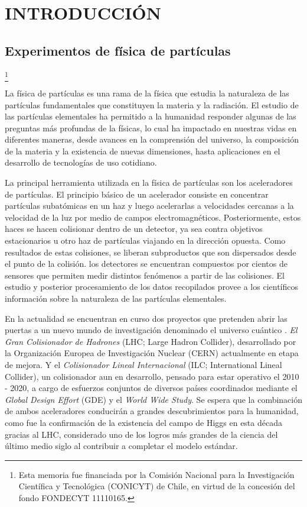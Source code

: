 \newcommand\blfootnote[1]{%
  \begingroup
  \renewcommand\thefootnote{}\footnote{#1}%
  \addtocounter{footnote}{-1}%
  \endgroup
}

\chapter{INTRODUCCIÓN}
\label{chapter:introduction}
\section{Experimentos de física de partículas}
\blfootnote{Esta memoria fue financiada por la Comisión Nacional para la Investigación Científica y Tecnológica (CONICYT) de Chile, en virtud de la concesión del fondo FONDECYT  11110165.} 


La física de partículas es una rama de la física que estudia la naturaleza de las partículas fundamentales que constituyen la materia y la radiación\citep{wiki}. El estudio de las partículas elementales ha permitido a la humanidad responder algunas de las preguntas más profundas de la físicas, lo cual ha impactado en nuestras vidas en diferentes maneras, desde avances en la comprensión del universo, la composición de la materia y la existencia de nuevas dimensiones, hasta aplicaciones en el desarrollo de tecnologías de uso cotidiano. 

La principal herramienta utilizada en la física de partículas son los aceleradores de partículas. El principio básico de un acelerador consiste en concentrar partículas subatómicas en un haz y luego acelerarlas a velocidades cercanas a la velocidad de la luz por medio de campos electromagnéticos. Posteriormente, estos haces se hacen colisionar dentro de un detector, ya sea contra objetivos estacionarios u otro haz de partículas viajando en la dirección opuesta.  Como resultados de estas colisiones, se liberan subproductos que son dispersados desde el punto de la colisión. los detectores se encuentran compuestos por cientos de sensores que permiten medir distintos fenómenos a partir de las colisiones. El estudio y posterior procesamiento de los datos recopilados  provee a los científicos información sobre la naturaleza de las partículas elementales.

En la actualidad se encuentran en curso dos proyectos que pretenden abrir las puertas a un nuevo mundo de investigación denominado el universo cuántico \citep{ilc101}. \textit{El Gran Colisionador de Hadrones} (LHC; Large Hadron Collider), desarrollado por la Organización Europea de Investigación Nuclear (CERN) actualmente en etapa de mejora. Y el \textit{Colisionador Lineal Internacional} (ILC; International Lineal Collider), un colisionador aun en desarrollo, pensado para estar operativo el 2010 - 2020, a cargo de esfuerzos conjuntos de diversos países coordinados mediante el \textit{Global Design Effort} (GDE) y el \textit{World Wide Study}. Se espera que la combinación de ambos aceleradores conducirán a grandes descubrimientos para la humanidad, como fue la confirmación de la existencia del campo de Higgs en esta década gracias al LHC, considerado uno de los logros más grandes de la ciencia del último medio siglo al contribuir a completar el modelo estándar.

